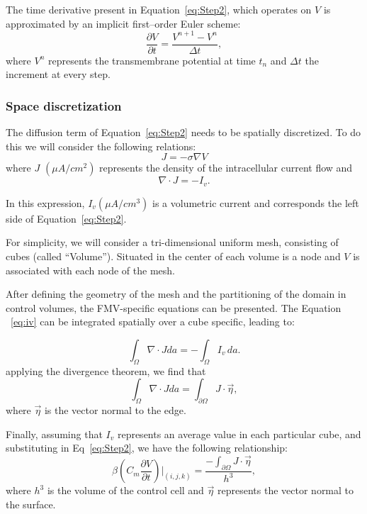 The time derivative present in Equation~\eqref{eq:Step2}, which operates on $V$
is approximated by an implicit first--order Euler scheme:
\begin{equation}
\frac{\partial V}{\partial t} = \frac{V^{n+1}-V^{n}}{\Delta t},
\label{eq:tempo}
\end{equation}
where $V^{n}$ represents the transmembrane potential at time
$t_{n} $ and $\Delta t$ the increment at every step.

\subsubsection{Space discretization}

The diffusion term of Equation~\eqref{eq:Step2} needs to be spatially
discretized. To do this we will consider the following relations:
\begin{equation}
  J = -\sigma \nabla V
  \label{eq:ji}
\end{equation}
where $J$ $(\mu A/cm^2)$ represents the density of the intracellular current
flow and
\begin{equation}
  \nabla \cdot J = -I_v.
  \label{eq:iv}
\end{equation}

In this expression, $I_v (\mu A/cm^3)$ is a volumetric current and corresponds
the left side of Equation~\eqref{eq:Step2}.

For simplicity, we will consider a tri-dimensional uniform mesh, consisting  of
cubes (called ``Volume''). Situated in the center of each volume
is a node and $V$ is associated with each node of the mesh.

After defining the geometry of the mesh and the partitioning of the domain
in control volumes, the FMV-specific equations can be presented.
The Equation ~\eqref{eq:iv} can be integrated spatially over a cube
specific, leading to:

\begin{equation}
  \int_{\Omega} \nabla \cdot J da = -\int_{\Omega} I_v \, da.
\end{equation}
applying the divergence theorem, we find that
\begin{equation}
  \int_{\Omega} \nabla \cdot J da = \int_{\partial \Omega} J \cdot \vec{\eta},
\end{equation}
where $\vec{\eta}$ is the vector normal to the edge.

Finally, assuming that $ I_v$ represents an average value in each particular
cube, and substituting in Eq~\eqref{eq:Step2}, we have the following
relationship:
\begin{equation}
    \beta\left (C_m \dfrac{\partial V}{\partial t} \right)\bigg|_{(i,j,k)}
     = \dfrac{-\int_{\partial \Omega} J \cdot \vec{\eta}}{h^3},
     \label{eq:mono2}
\end{equation}
where $h^3 $ is the volume of the control cell and $\vec{\eta}$
represents the vector normal to the surface.


